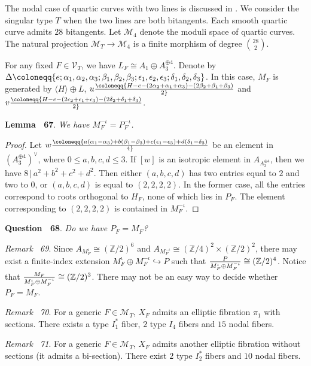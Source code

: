 \documentclass[
]{article}
\begin{document}
The nodal case of quartic curves with two lines is discussed in
\cite{gallardo2018compactifications}. We consider the singular type
\(T\) when the two lines are both bitangents. Each smooth quartic curve
admits \(28\) bitangents. Let \(\mathcal{M}_4\) denote the moduli space
of quartic curves. The natural projection
\(\mathcal{M}_T\to \mathcal{M}_4\) is a finite morphism of degree
\(\binom{28}{2}\).

For any fixed \(F\in\mathcal{V}_{T}\), we have
\(L_F\cong A_1\oplus A_3^{\oplus 4}\). Denote by
\(\Delta\coloneqq \{ e;\alpha_1,\alpha_2,\alpha_3;\beta_1,\beta_2,\beta_3;\\ \epsilon_1,\epsilon_2,\epsilon_3;\delta_1,\delta_2,\delta_3 \}\).
In this case, \(M_F\) is generated by \(\langle H\rangle \oplus L\),
\(u\coloneqq{H-e-(2\alpha_2+\alpha_1+\alpha_3)-(2\beta_2+\beta_1+\beta_3)\over2}\)
and
\(v\coloneqq{H-e-(2\epsilon_2+\epsilon_1+\epsilon_3)-(2\delta_2+\delta_1+\delta_3)\over2}\).

\textbf{Lemma~ 67}. \emph{We have \(M_F^{-\iota}=P_F^{-\iota}\).}

\emph{Proof.} Let
\(w\coloneqq{a(\alpha_1-\alpha_3)+b(\beta_1-\beta_3)+c(\epsilon_1-\epsilon_3)+d(\delta_1-\delta_3)\over4}\)
be an element in \((A_3^{\oplus4})^\vee\), where \(0\le a,b,c,d\le 3\).
If \([w]\) is an isotropic element in \(A_{A_3^{\oplus4}}\), then we
have \(8\,|\,a^2+b^2+c^2+d^2\). Then either \((a,b,c,d)\) has two
entries equal to \(2\) and two to \(0\), or \((a,b,c,d)\) is equal to
\((2,2,2,2)\). In the former case, all the entries correspond to roots
orthogonal to \(H_F\), none of which lies in \(P_F\). The element
corresponding to \((2,2,2,2)\) is contained in \(M_F^{-\iota}\).~◻

\textbf{Question~ 68}. \emph{Do we have \(P_F=M_F\)?}

\emph{Remark~ 69}. Since \(A_{M_F^{\iota}}\cong(\mathbb{Z}/2)^6\) and
\(A_{M_F^{-\iota}}\cong(\mathbb{Z}/4)^2\times(\mathbb{Z}/2)^2\), there
may exist a finite-index extension
\(M_F^{\iota}\oplus M_F^{-\iota}\hookrightarrow P\) such that
\({P\over M_F^{\iota}\oplus M_F^{-\iota}}\cong(\mathbb{Z}/2)^4\). Notice
that \({M_F\over M_F^{\iota}\oplus M_F^{-\iota}}\cong(\mathbb{Z}/2)^3\).
There may not be an easy way to decide whether \(P_F=M_F\).

\emph{Remark~ 70}. For a generic \(F\in\mathcal{M}_T\), \(X_F\) admits
an elliptic fibration \(\pi_1\) with sections. There exists a type
\(I_1^*\) fiber, \(2\) type \(I_4\) fibers and \(15\) nodal fibers.

\emph{Remark~ 71}. For a generic \(F\in\mathcal{M}_T\), \(X_F\) admits
another elliptic fibration without sections (it admits a bi-section).
There exist \(2\) type \(I_2^*\) fibers and \(10\) nodal fibers.
\end{document}

